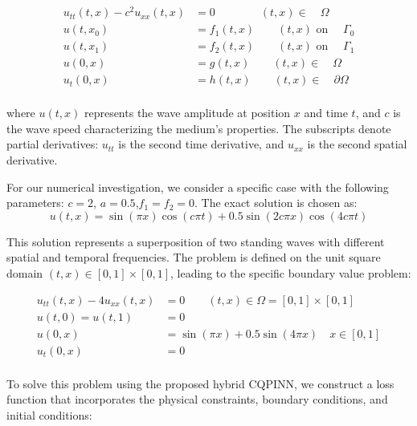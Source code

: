 \begin{equation}
\begin{split}
        u_{tt}(t,x) - c^2u_{xx}(t,x) &= 0  \qquad \qquad  (t,x) \in \quad \Omega \\ 
        u(t,x_0)  &= f_1(t,x) \qquad (t,x)   \text{ on } \quad  \Gamma_0\\
        u(t,x_1)  &= f_2(t,x) \qquad (t,x) \text{ on } \quad \Gamma_1\\
        u(0,x)  &= g(t,x)  \qquad (t,x)  \in \quad \Omega\\
        u_t(0,x) &= h(t,x) \qquad (t,x)  \in \quad  \partial \Omega\\
\end{split}
\end{equation}

\noindent where $u(t,x)$ represents the wave amplitude at position $x$ and time $t$, and $c$ is the wave speed characterizing the medium's properties. The subscripts denote partial derivatives: $u_{tt}$ is the second time derivative, and $u_{xx}$ is the second spatial derivative.

\noindent  For our numerical investigation, we consider a specific case with the following parameters: $c=2$, $a=0.5$,$f_1=f_2=0$. The exact solution is chosen as:
\begin{equation}
u(t,x) = \sin(\pi x) \cos(c\pi t) + 0.5 \sin(2c\pi x) \cos(4c\pi t)
\end{equation}

\noindent  This solution represents a superposition of two standing waves with different spatial and temporal frequencies. The problem is defined on the unit square domain $(t,x) \in [0,1] \times [0,1]$, leading to the specific boundary value problem:

\begin{equation}
\begin{split}
        u_{tt}(t,x) -4 u_{xx}(t,x) &= 0 \qquad(t,x) \in \Omega =[0,1] \times [0,1] \\ 
        u(t,0) = u(t,1) &= 0 \\
        u(0,x)  &= \sin(\pi x) + 0.5 \sin(4\pi x)  \quad x \in [0,1] \\
        u_t(0,x) &= 0  \\
\end{split}
\label{eq:1DWave}
\end{equation}

\noindent To solve this problem using the proposed hybrid CQPINN, we construct a loss function that incorporates the physical constraints, boundary conditions, and initial conditions:

